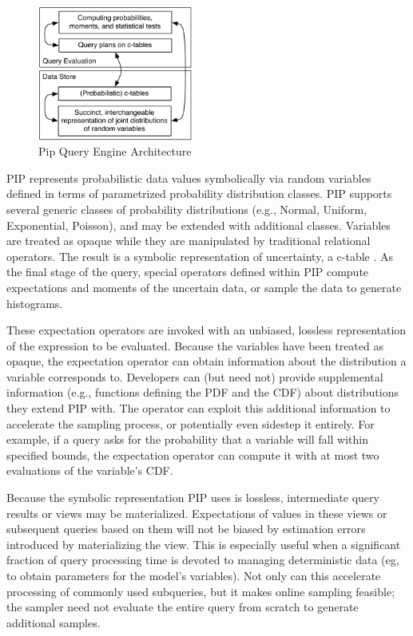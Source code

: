 %
\begin{figure}
\begin{center}
\includegraphics[width=2in]{graphics/arch.pdf}
\vspace*{-0.1in}
\caption{Pip Query Engine Architecture}
\label{fig:arch}
\end{center}
\vspace*{-0.35in}
\end{figure}

PIP represents probabilistic data values symbolically via random variables defined in terms of parametrized probability distribution classes.  PIP supports several generic classes of probability distributions (e.g., Normal, Uniform, Exponential, Poisson), and may be extended with additional classes.  Variables are treated as opaque while they are manipulated by traditional relational operators.  The result is a symbolic representation of uncertainty, a c-table \cite{IL1984,GT2006, KochMayBMS2008}.  As the final stage of the query, special operators defined within PIP compute expectations and moments of the uncertain data, or sample the data to generate histograms.  

These expectation operators are invoked with an unbiased, lossless representation of the expression to be evaluated.  Because the variables have been treated as opaque, the expectation operator can obtain information about the distribution a variable corresponds to.  Developers can (but need not) provide supplemental information (e.g., functions defining the PDF and the CDF) about distributions they extend PIP with.  The operator can exploit this additional information to accelerate the sampling process, or potentially even sidestep it entirely.  For example, if a query asks for the probability that a variable will fall within specified bounds, the expectation operator can compute it with at most two evaluations of the variable's CDF.

Because the symbolic representation PIP uses is lossless, intermediate query results or views may be materialized.  Expectations of values in these views or subsequent queries based on them will not be biased by estimation errors introduced by materializing the view.  This is especially useful when a significant fraction of query processing time is devoted to managing deterministic data (eg, to obtain parameters for the model's variables).  Not only can this accelerate processing of commonly used subqueries, but it makes online sampling feasible; the sampler need not evaluate the entire query from scratch to generate additional samples.


